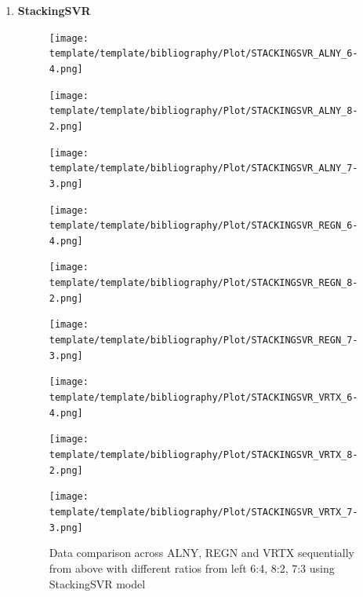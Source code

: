 \documentclass{ieeeojies}
\begin{document}
\begin{enumerate}
  \item \textbf{StackingSVR} 
\begin{figure}[H]
    \centering
    \begin{minipage}{0.155\textwidth}
    \centering
    \texttt{[image: template/template/bibliography/Plot/STACKINGSVR\_ALNY\_6-4.png]}
    \end{minipage}
    \hfill
    \begin{minipage}{0.155\textwidth}
    \centering
    \texttt{[image: template/template/bibliography/Plot/STACKINGSVR\_ALNY\_8-2.png]}
    \end{minipage}
    \hfill
    \begin{minipage}{0.155\textwidth}
    \centering
    \texttt{[image: template/template/bibliography/Plot/STACKINGSVR\_ALNY\_7-3.png]}
    \end{minipage}
    \hfill
    \begin{minipage}{0.155\textwidth}
    \centering
    \texttt{[image: template/template/bibliography/Plot/STACKINGSVR\_REGN\_6-4.png]}
    \end{minipage}
    \hfill
    \begin{minipage}{0.155\textwidth}
    \centering
    \texttt{[image: template/template/bibliography/Plot/STACKINGSVR\_REGN\_8-2.png]}
    \end{minipage}
    \hfill
    \begin{minipage}{0.155\textwidth}
    \centering
    \texttt{[image: template/template/bibliography/Plot/STACKINGSVR\_REGN\_7-3.png]}
    \end{minipage}
    \hfill
    \begin{minipage}{0.155\textwidth}
    \centering
    \texttt{[image: template/template/bibliography/Plot/STACKINGSVR\_VRTX\_6-4.png]}
    \end{minipage}
    \hfill
    \begin{minipage}{0.155\textwidth}
    \centering
    \texttt{[image: template/template/bibliography/Plot/STACKINGSVR\_VRTX\_8-2.png]}
    \end{minipage}
    \hfill
    \begin{minipage}{0.155\textwidth}
    \centering
    \texttt{[image: template/template/bibliography/Plot/STACKINGSVR\_VRTX\_7-3.png]}
    \end{minipage}
\caption{Data comparison across ALNY, REGN and VRTX sequentially from above with different ratios from left 6:4, 8:2, 7:3 using StackingSVR model}
\label{fig:combined}
\end{figure}


\end{enumerate}
\end{document}
